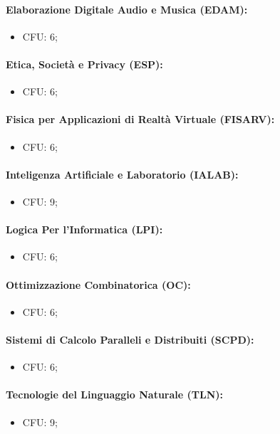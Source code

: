 \paragraph{Elaborazione Digitale Audio e Musica (EDAM):}

\begin{itemize}
  \item CFU: 6;
\end{itemize}

\paragraph{Etica, Società e Privacy (ESP):}

\begin{itemize}
  \item CFU: 6;
\end{itemize}

\paragraph{Fisica per Applicazioni di Realtà Virtuale (FISARV):}

\begin{itemize}
  \item CFU: 6;
\end{itemize}

\paragraph{Inteligenza Artificiale e Laboratorio (IALAB):}

\begin{itemize}
  \item CFU: 9;
\end{itemize}

\paragraph{Logica Per l'Informatica (LPI):}

\begin{itemize}
  \item CFU: 6;
\end{itemize}

\paragraph{Ottimizzazione Combinatorica (OC):}

\begin{itemize}
  \item CFU: 6;
\end{itemize}

\paragraph{Sistemi di Calcolo Paralleli e Distribuiti (SCPD):}

\begin{itemize}
  \item CFU: 6;
\end{itemize}

\paragraph{Tecnologie del Linguaggio Naturale (TLN):}

\begin{itemize}
  \item CFU: 9;
\end{itemize}
